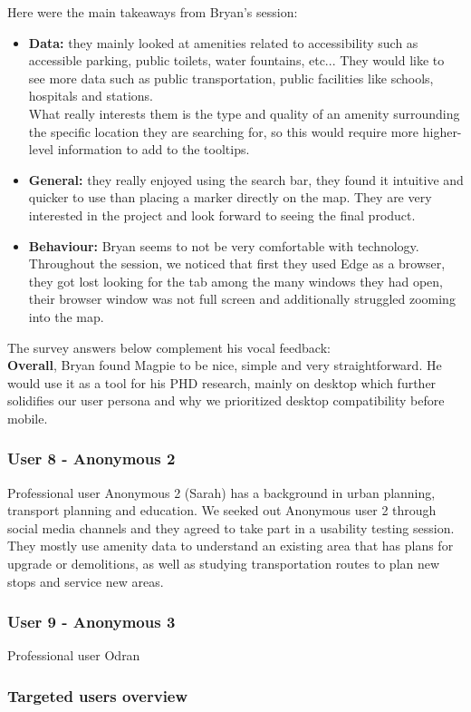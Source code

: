 \newpage Here were the main takeaways from Bryan's session:
\begin{itemize}
    \item \textbf{Data: }they mainly looked at amenities related to accessibility such as accessible parking, public toilets, water fountains, etc... They would like to see more data such as public transportation, public facilities like schools, hospitals and stations.\\ What really interests them is the type and quality of an amenity surrounding the specific location they are searching for, so this would require more higher-level information to add to the tooltips.\\
    \item \textbf{General: }they really enjoyed using the search bar, they found it intuitive and quicker to use than placing a marker directly on the map. They are very interested in the project and look forward to seeing the final product.\\
    \item \textbf{Behaviour: } Bryan seems to not be very comfortable with technology. Throughout the session, we noticed that first they used Edge as a browser, they got lost looking for the tab among the many windows they had open, their browser window was not full screen and additionally struggled zooming into the map.
\end{itemize}
The survey answers below complement his vocal feedback:
\\

\noindent\textbf{Overall}, Bryan found Magpie to be nice, simple and very straightforward. He would use it as a tool for his PHD research, mainly on desktop which further solidifies our user persona and why we prioritized desktop compatibility before mobile.

\newpage
\subsubsection{User 8 - Anonymous 2}
Professional user Anonymous 2 (Sarah) has a background in urban planning, transport planning and education. We seeked out Anonymous user 2 through social media channels and they agreed to take part in a usability testing session.\\
They mostly use amenity data to understand an existing area that has plans for upgrade or demolitions, as well as studying transportation routes to plan new stops and service new areas.\\

\newpage
\subsubsection{User 9 - Anonymous 3}
Professional user Odran

\newpage
\subsubsection{Targeted users overview}